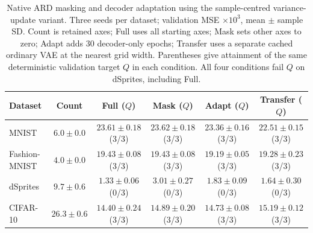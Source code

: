 \begin{table}[H]
\caption{Native ARD masking and decoder adaptation using the sample-centred variance-update variant. Three seeds per dataset; validation MSE $\times10^3$, mean $\pm$ sample SD. Count is retained axes; Full uses all starting axes; Mask sets other axes to zero; Adapt adds 30 decoder-only epochs; Transfer uses a separate cached ordinary VAE at the nearest grid width. Parentheses give attainment of the same deterministic validation target $Q$ in each condition. All four conditions fail $Q$ on dSprites, including Full.}\label{tab:ardpruned}
\footnotesize
\setlength{\tabcolsep}{3pt}
\begin{tabular*}{\textwidth}{@{\extracolsep{\fill}}lccccc@{}}
\toprule
Dataset & Count & Full ($Q$) & Mask ($Q$) & Adapt ($Q$) & Transfer ($Q$) \\
\midrule
MNIST & $6.0 \pm 0.0$ & $23.61 \pm 0.18$ (3/3) & $23.62 \pm 0.18$ (3/3) & $23.36 \pm 0.16$ (3/3) & $22.51 \pm 0.15$ (3/3) \\
Fashion-MNIST & $4.0 \pm 0.0$ & $19.43 \pm 0.08$ (3/3) & $19.43 \pm 0.08$ (3/3) & $19.19 \pm 0.05$ (3/3) & $19.28 \pm 0.23$ (3/3) \\
dSprites & $9.7 \pm 0.6$ & $1.33 \pm 0.06$ (0/3) & $3.01 \pm 0.27$ (0/3) & $1.83 \pm 0.09$ (0/3) & $1.64 \pm 0.30$ (0/3) \\
CIFAR-10 & $26.3 \pm 0.6$ & $14.40 \pm 0.24$ (3/3) & $14.89 \pm 0.20$ (3/3) & $14.73 \pm 0.08$ (3/3) & $15.19 \pm 0.12$ (3/3) \\
\bottomrule\end{tabular*}
\end{table}
